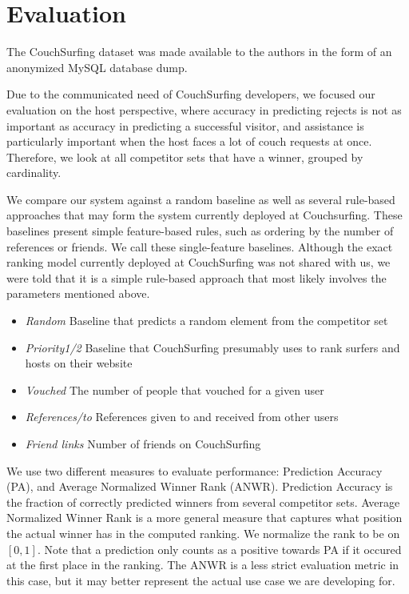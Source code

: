 \section{Evaluation} \label{sec:evaluation}

The CouchSurfing dataset was made available to the authors in the form of an anonymized MySQL database dump.

Due to the communicated need of CouchSurfing developers, we focused our evaluation on the host perspective, where accuracy in predicting rejects is not as important as accuracy in predicting a successful visitor, and assistance is particularly important when the host faces a lot of couch requests at once.
Therefore, we look at all competitor sets that have a winner, grouped by cardinality.

We compare our system against a random baseline as well as several rule-based approaches that may form the system currently deployed at Couchsurfing.
These baselines present simple feature-based rules, such as ordering by the number of references or friends.
We call these single-feature baselines.
Although the exact ranking model currently deployed at CouchSurfing was not shared with us, we were told that it is a simple rule-based approach that most likely involves the parameters mentioned above.

\begin{itemize}
\item \textit{Random} Baseline that predicts a random element from the
competitor set
\item \textit{Priority1/2} Baseline that CouchSurfing presumably uses
to rank surfers and hosts on their website
\item \textit{Vouched} The number of people that vouched for a given user
\item \textit{References/to} References given to and received from other users
\item \textit{Friend links} Number of friends on CouchSurfing
\end{itemize}

We use two different measures to evaluate performance: Prediction Accuracy (PA), and Average Normalized Winner Rank (ANWR).
Prediction Accuracy is the fraction of correctly predicted winners from several competitor sets.
Average Normalized Winner Rank is a more general measure that captures what position the actual winner has in the computed ranking.
We normalize the rank to be on $[0,1]$.
Note that a prediction only counts as a positive towards PA if it occured at the first place in the ranking.
The ANWR is a less strict evaluation metric in this case, but it may better represent the actual use case we are developing for.

